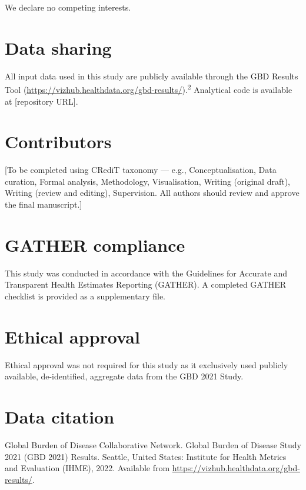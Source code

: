 \documentclass[12pt]{article}
\begin{document}
We declare no competing interests.

\section*{Data sharing}

All input data used in this study are publicly available through the GBD Results Tool (\url{https://vizhub.healthdata.org/gbd-results/}).\textsuperscript{2} Analytical code is available at [repository URL].

\section*{Contributors}

[To be completed using CRediT taxonomy --- e.g., Conceptualisation, Data curation, Formal analysis, Methodology, Visualisation, Writing (original draft), Writing (review and editing), Supervision. All authors should review and approve the final manuscript.]

\section*{GATHER compliance}

This study was conducted in accordance with the Guidelines for Accurate and Transparent Health Estimates Reporting (GATHER). A completed GATHER checklist is provided as a supplementary file.

\section*{Ethical approval}

Ethical approval was not required for this study as it exclusively used publicly available, de-identified, aggregate data from the GBD 2021 Study.

\section*{Data citation}

Global Burden of Disease Collaborative Network. Global Burden of Disease Study 2021 (GBD 2021) Results. Seattle, United States: Institute for Health Metrics and Evaluation (IHME), 2022. Available from \url{https://vizhub.healthdata.org/gbd-results/}.

\end{document}
